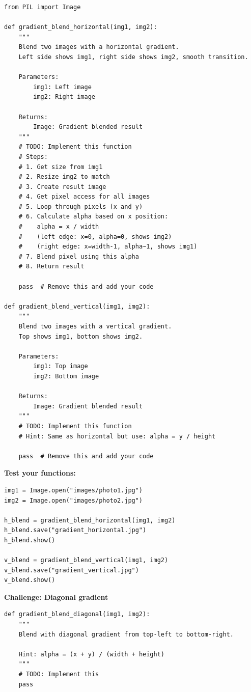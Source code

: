 \documentclass[11pt]{article}
\begin{document}
\begin{lstlisting}
from PIL import Image

def gradient_blend_horizontal(img1, img2):
    """
    Blend two images with a horizontal gradient.
    Left side shows img1, right side shows img2, smooth transition.

    Parameters:
        img1: Left image
        img2: Right image

    Returns:
        Image: Gradient blended result
    """
    # TODO: Implement this function
    # Steps:
    # 1. Get size from img1
    # 2. Resize img2 to match
    # 3. Create result image
    # 4. Get pixel access for all images
    # 5. Loop through pixels (x and y)
    # 6. Calculate alpha based on x position:
    #    alpha = x / width
    #    (left edge: x=0, alpha=0, shows img2)
    #    (right edge: x=width-1, alpha~1, shows img1)
    # 7. Blend pixel using this alpha
    # 8. Return result

    pass  # Remove this and add your code

def gradient_blend_vertical(img1, img2):
    """
    Blend two images with a vertical gradient.
    Top shows img1, bottom shows img2.

    Parameters:
        img1: Top image
        img2: Bottom image

    Returns:
        Image: Gradient blended result
    """
    # TODO: Implement this function
    # Hint: Same as horizontal but use: alpha = y / height

    pass  # Remove this and add your code
\end{lstlisting}

\textbf{Test your functions:}

\begin{lstlisting}
img1 = Image.open("images/photo1.jpg")
img2 = Image.open("images/photo2.jpg")

h_blend = gradient_blend_horizontal(img1, img2)
h_blend.save("gradient_horizontal.jpg")
h_blend.show()

v_blend = gradient_blend_vertical(img1, img2)
v_blend.save("gradient_vertical.jpg")
v_blend.show()
\end{lstlisting}

\textbf{Challenge: Diagonal gradient}

\begin{lstlisting}
def gradient_blend_diagonal(img1, img2):
    """
    Blend with diagonal gradient from top-left to bottom-right.

    Hint: alpha = (x + y) / (width + height)
    """
    # TODO: Implement this
    pass
\end{lstlisting}
\end{document}
